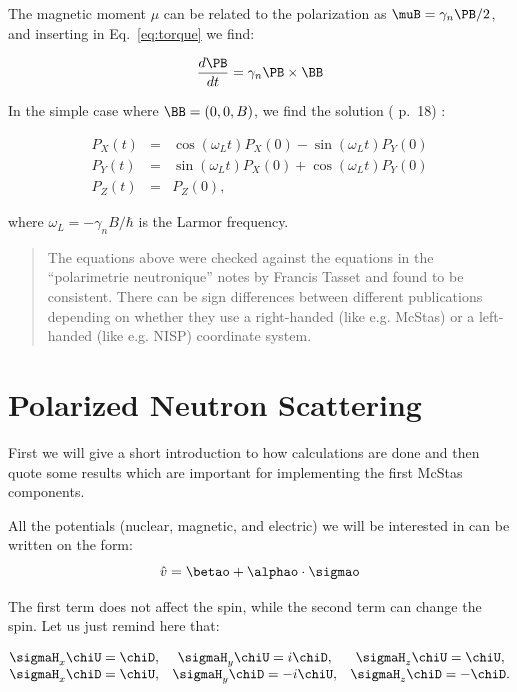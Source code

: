 The magnetic moment $\mu$ can be related to the polarization as $\muB
= \gamma_n \PB/2$, and inserting in Eq.~\ref{eq:torque} we find:

\begin{equation}
  \label{eq:pol_magnetic}
  \frac{d\PB}{dt} = \gamma_n \PB \times \BB
\end{equation}

In the simple case where $\BB = (0, 0, B)$, we find the solution
(\cite{gavin} p.~18) :

\begin{eqnarray}
  \nonumber
  P_X(t) & = & \cos(\omega_L t) P_X(0) - \sin(\omega_L t) P_Y(0) \\
  \label{eq:precession}
  P_Y(t) & = & \sin(\omega_L t) P_X(0) + \cos(\omega_L t) P_Y(0) \\
  \nonumber
  P_Z(t) & = & P_Z(0),
\end{eqnarray}

where $\omega_L = -\gamma_n B/\hbar$ is the Larmor frequency.\\

\begin{quote}
  The equations above were checked against the equations in the ``polarimetrie
  neutronique'' notes by Francis Tasset and found to be consistent. There can
  be sign differences between different publications depending on whether they
  use a right-handed (like e.g. McStas) or a left-handed (like e.g. NISP)
  coordinate system.
\end{quote}

\section{Polarized Neutron Scattering}
\label{sec:scat}

First we will give a short introduction to how calculations are done
and then quote some results which are important for implementing the
first McStas components.

All the potentials (nuclear, magnetic, and electric) we will be interested in
can be written on the form:
\begin{equation}
  \label{eq:general_pot}
  \hat{v} = \betao + \alphao \cdot \sigmao
\end{equation}

The first term does not affect the spin, while the second term can
change the spin. Let us just remind here that:

\begin{equation}
  \label{eq:pauli_rules}
  \begin{matrix}
    \sigmaH_x \chiU = \chiD, &
    \sigmaH_y \chiU = i\chiD, &
    \sigmaH_z \chiU = \chiU, \\
    \sigmaH_x \chiD = \chiU, &
    \sigmaH_y \chiD = -i\chiU, &
    \sigmaH_z \chiD = -\chiD.
  \end{matrix}
\end{equation}

